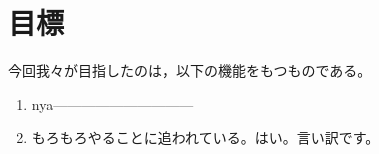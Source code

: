 \documentclass[report.tex]{subfiles}
\begin{document}
\section{目標}
今回我々が目指したのは，以下の機能をもつものである。
\begin{enumerate}
  \item nya------------------------------
  \item もろもろやることに追われている。はい。言い訳です。
\end{enumerate}
\end{document}
